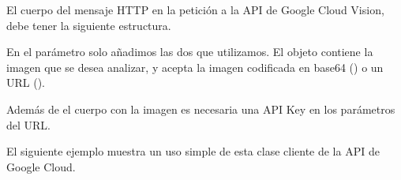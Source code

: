 El cuerpo del mensaje HTTP en la petición a la API de Google Cloud Vision,
debe tener la siguiente estructura.

\begin{sphinxVerbatim}[commandchars=\\\{\}]
   \PYG{p}{[}
       \PYG{p}{[}
           
           
      \PYG{p}{]}
       
         
         
           
  \PYG{p}{]}
\end{sphinxVerbatim}

En el parámetro  solo añadimos las dos que utilizamos. El objeto
 contiene la imagen que se desea analizar, y acepta la imagen codificada
en base64 () o un URL ().

Además de el cuerpo con la imagen es necesaria una API Key en los parámetros
del URL.

El siguiente ejemplo muestra un uso simple de esta clase cliente de la API
de Google Cloud.


